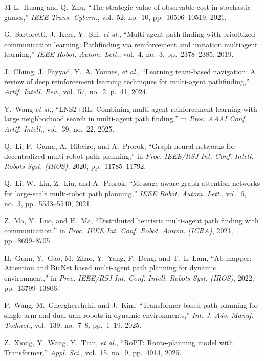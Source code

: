 \documentclass[sigconf]{acmart}
\newcommand{\etal}{\textit{et al.}}
\begin{document}
{\begin{thebibliography}{31}
L.~Huang and Q.~Zhu,
``The strategic value of observable cost in stochastic games,''
\emph{IEEE Trans. Cybern.}, vol.~52, no.~10,
pp.~10506--10519, 2021.

G.~Sartoretti, J.~Kerr, Y.~Shi, \etal,
``Multi-agent path finding with prioritized communication
learning: Pathfinding via reinforcement and imitation multiagent
learning,''
\emph{IEEE Robot. Autom. Lett.}, vol.~4, no.~3,
pp.~2378--2385, 2019.

J.~Chung, J.~Fayyad, Y.~A. Younes, \etal,
``Learning team-based navigation: A review of deep reinforcement
learning techniques for multi-agent pathfinding,''
\emph{Artif. Intell. Rev.}, vol.~57, no.~2, p.~41, 2024.

Y.~Wang \etal,
``LNS2+RL: Combining multi-agent reinforcement learning with
large neighborhood search in multi-agent path finding,''
in \emph{Proc. AAAI Conf. Artif. Intell.}, vol.~39, no.~22,
2025.

Q.~Li, F.~Gama, A.~Ribeiro, and A.~Prorok,
``Graph neural networks for decentralized multi-robot path
planning,''
in \emph{Proc. IEEE/RSJ Int. Conf. Intell. Robots Syst. (IROS)},
2020, pp.~11785--11792.

Q.~Li, W.~Lin, Z.~Liu, and A.~Prorok,
``Message-aware graph attention networks for large-scale
multi-robot path planning,''
\emph{IEEE Robot. Autom. Lett.}, vol.~6, no.~3,
pp.~5533--5540, 2021.

Z.~Ma, Y.~Luo, and H.~Ma,
``Distributed heuristic multi-agent path finding with
communication,''
in \emph{Proc. IEEE Int. Conf. Robot. Autom. (ICRA)},
2021, pp.~8699--8705.

H.~Guan, Y.~Gao, M.~Zhao, Y.~Yang, F.~Deng, and T.~L. Lam,
``Ab-mapper: Attention and BicNet based multi-agent path planning
for dynamic environment,''
in \emph{Proc. IEEE/RSJ Int. Conf. Intell. Robots Syst. (IROS)},
2022, pp.~13799--13806.

P.~Wang, M.~Ghergherehchi, and J.~Kim,
``Transformer-based path planning for single-arm and dual-arm
robots in dynamic environments,''
\emph{Int. J. Adv. Manuf. Technol.}, vol.~139, no.~7--8,
pp.~1--19, 2025.

Z.~Xiong, Y.~Wang, Y.~Tian, \etal,
``RoPT: Route-planning model with Transformer,''
\emph{Appl. Sci.}, vol.~15, no.~9, pp.~4914, 2025.


\end{thebibliography}}
\end{document}
